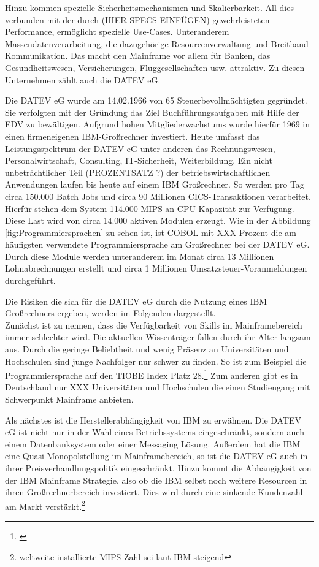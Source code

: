 Hinzu kommen spezielle Sicherheitsmechanismen und Skalierbarkeit.
All dies verbunden mit der durch (HIER SPECS EINFÜGEN) gewehrleisteten Performance, ermöglicht spezielle Use-Cases.
Unteranderem Massendatenverarbeitung, die dazugehörige Resourcenverwaltung und Breitband Kommunikation.
Das macht den Mainframe vor allem für Banken, das Gesundheitswesen, Versicherungen, Fluggesellschaften usw. attraktiv.
Zu diesen Unternehmen zählt auch die DATEV eG.
\cite{IBM.2014}

Die DATEV eG wurde am 14.02.1966 von 65 Steuerbevollmächtigten gegründet.
Sie verfolgten mit der Gründung das Ziel Buchführungsaufgaben mit Hilfe der EDV zu bewältigen.
Aufgrund hohen Mitgliederwachstums wurde hierfür 1969 in einen firmeneigenen IBM-Großrechner investiert.\cite{DATEVeG.2017}
Heute umfasst das Leistungsspektrum der DATEV eG unter anderen das Rechnungswesen, Personalwirtschaft, Consulting, IT-Sicherheit, Weiterbildung.
Ein nicht unbeträchtlicher Teil (PROZENTSATZ ?) der betriebswirtschaftlichen Anwendungen laufen bis heute auf einem IBM Großrechner.
So werden pro Tag circa 150.000 Batch Jobs und circa 90 Millionen CICS-Transaktionen verarbeitet.
Hierfür stehen dem System 114.000 MIPS an CPU-Kapazität zur Verfügung.
Diese Last wird von circa 14.000 aktiven Modulen erzeugt.
Wie in der Abbildung \ref{fig:Programmiersprachen} zu sehen ist, ist COBOL mit XXX Prozent die am häufigsten verwendete Programmiersprache am Großrechner bei der DATEV eG.
Durch diese Module werden unteranderem im Monat circa 13 Millionen Lohnabrechnungen erstellt und circa 1 Millionen Umsatzsteuer-Voranmeldungen durchgeführt.

Die Risiken die sich für die DATEV eG durch die Nutzung eines IBM Großrechners ergeben, werden im Folgenden dargestellt.\\
Zunächst ist zu nennen, dass die Verfügbarkeit von Skills im Mainframebereich immer schlechter wird.
Die aktuellen Wissenträger fallen durch ihr Alter langsam aus.
Durch die geringe Beliebtheit und wenig Präsenz an Universitäten und Hochschulen sind junge Nachfolger nur schwer zu finden.
So ist zum Beispiel die Programmiersprache auf den TIOBE Index Platz 28.\footnote{\cite{TIOBESoftwareBV.25.11.2019}}
Zum anderen gibt es in Deutschland nur XXX Universitäten und Hochschulen die einen Studiengang mit Schwerpunkt Mainframe anbieten.\cite{fehlt noch}

Als nächstes ist die Herstellerabhängigkeit von IBM zu erwähnen.
Die DATEV eG ist nicht nur in der Wahl eines Betriebssystems eingeschränkt, sondern auch einem Datenbanksystem oder einer Messaging Lösung.
Außerdem hat die IBM eine Quasi-Monopolstellung\cite{fehlt noch} im Mainframebereich, so ist die DATEV eG auch in ihrer Preisverhandlungspolitik eingeschränkt.
Hinzu kommt die Abhängigkeit von der IBM Mainframe Strategie, also ob die IBM selbst noch weitere Resourcen in ihren Großrechnerbereich investiert.
Dies wird durch eine sinkende Kundenzahl am Markt verstärkt.\footnote{weltweite installierte MIPS-Zahl sei laut IBM steigend}

